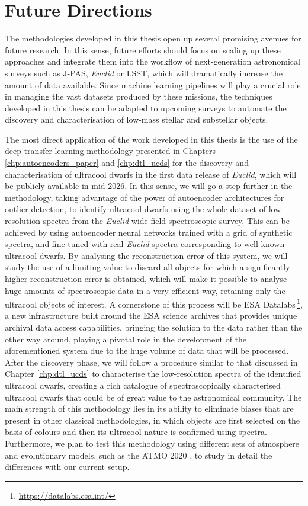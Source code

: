 \section{Future Directions}

The methodologies developed in this thesis open up several promising avenues for future research. In this sense, future efforts should focus on scaling up these approaches and integrate them into the workflow of next-generation astronomical surveys such as J-PAS, \textit{Euclid} or LSST, which will dramatically increase the amount of data available. Since machine learning pipelines will play a crucial role in managing the vast datasets produced by these missions, the techniques developed in this thesis can be adapted to upcoming surveys to automate the discovery and characterisation of low-mass stellar and substellar objects.

The most direct application of the work developed in this thesis is the use of the deep transfer learning methodology presented in Chapters \ref{chp:autoencoders_paper} and \ref{chp:dtl_ucds} for the discovery and characterisation of ultracool dwarfs in the first data release of \textit{Euclid}, which will be publicly available in mid-2026. In this sense, we will go a step further in the methodology, taking advantage of the power of autoencoder architectures for outlier detection, to identify ultracool dwarfs using the whole dataset of low-resolution spectra from the \textit{Euclid} wide-field spectroscopic survey. This can be achieved by using autoencoder neural networks trained with a grid of synthetic spectra, and fine-tuned with real \textit{Euclid} spectra corresponding to well-known ultracool dwarfs. By analysing the reconstruction error of this system, we will study the use of a limiting value to discard all objects for which a significantly higher reconstruction error is obtained, which will make it possible to analyse huge amounts of spectroscopic data in a very efficient way, retaining only the ultracool objects of interest. A cornerstone of this process will be ESA Datalabs\,\footnote{\url{https://datalabs.esa.int/}}, a new infrastructure built around the ESA science archives that provides unique archival data access capabilities, bringing the solution to the data rather than the other way around, playing a pivotal role in the development of the aforementioned system due to the huge volume of data that will be processed. After the discovery phase, we will follow a procedure similar to that discussed in Chapter \ref{chp:dtl_ucds} to characterise the low-resolution spectra of the identified ultracool dwarfs, creating a rich catalogue of spectroscopically characterised ultracool dwarfs that could be of great value to the astronomical community. The main strength of this methodology lies in its ability to eliminate biases that are present in other classical methodologies, in which objects are first selected on the basis of colours and then its ultracool nature is confirmed using spectra. Furthermore, we plan to test this methodology using different sets of atmosphere and evolutionary models, such as the ATMO 2020 \citep{atmo2020}, to study in detail the differences with our current setup.

